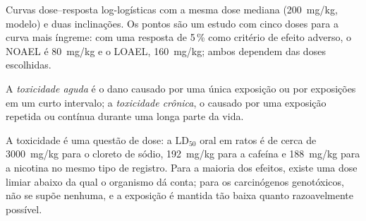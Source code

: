 \begin{omfigure}

{\small Curvas dose--resposta log-logísticas com a mesma dose mediana (\qty{200}{mg/kg},
modelo) e duas inclinações. Os pontos são um estudo com cinco doses para a curva mais
íngreme: com uma resposta de 5\,\% como critério de efeito adverso, o NOAEL é
\qty{80}{mg/kg} e o LOAEL, \qty{160}{mg/kg}; ambos dependem das doses escolhidas.}
\end{omfigure}

\begin{definition}\label{def:b3:environmental-toxicology:toxicity}
A \emph{toxicidade aguda} é o dano causado por uma única
exposição ou por exposições em um curto intervalo; a \emph{toxicidade crônica},
o causado por uma exposição repetida ou contínua durante uma longa parte da vida.
\end{definition}

A toxicidade é uma questão de dose: a $\mathrm{LD_{50}}$ oral em ratos é de cerca de \qty{3000}{mg/kg} para o cloreto de sódio,
\qty{192}{mg/kg} para a cafeína e \qty{188}{mg/kg} para a nicotina no mesmo tipo de registro. Para a maioria dos efeitos, existe uma
dose limiar abaixo da qual o organismo dá conta; para os carcinógenos genotóxicos,
não se supõe nenhuma, e a exposição é mantida tão baixa quanto razoavelmente possível.

